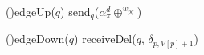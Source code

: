 
\SetInd{0.2em}{1em}

\small

\DontPrintSemicolon
\LinesNumbered

\Function(){\textup{edgeUp($q$)}}  {
     {
         send$_q$($\alpha_{\pi}^{d} \oplus ^{w_{pq}}$)
         }
}


\Function(){\textup{edgeDown($q$)}} {
   {
       receiveDel($q$, $\delta_{p, V[p]+1}$)
  }
}


